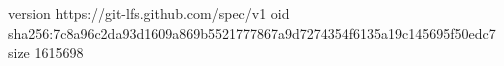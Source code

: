 version https://git-lfs.github.com/spec/v1
oid sha256:7c8a96c2da93d1609a869b5521777867a9d7274354f6135a19c145695f50edc7
size 1615698
